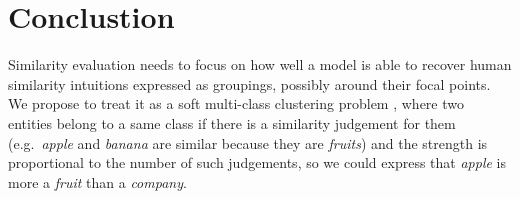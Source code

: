 \documentclass[11pt]{article}
\begin{document}
%
%


\section{Conclustion}

Similarity evaluation needs to focus on how well a model is able to recover human similarity intuitions expressed as groupings, possibly around their focal points. We propose to treat it as a soft multi-class clustering problem \cite{White:2015:WSE:2838931.2838932}, where two entities belong to a same class if there is a similarity judgement for them (e.g.~\textit{apple} and \textit{banana} are similar because they are \textit{fruits}) and the strength is proportional to the number of such judgements, so we could express that \textit{apple} is more a \textit{fruit} than a \textit{company}.




\balance
\end{document}
